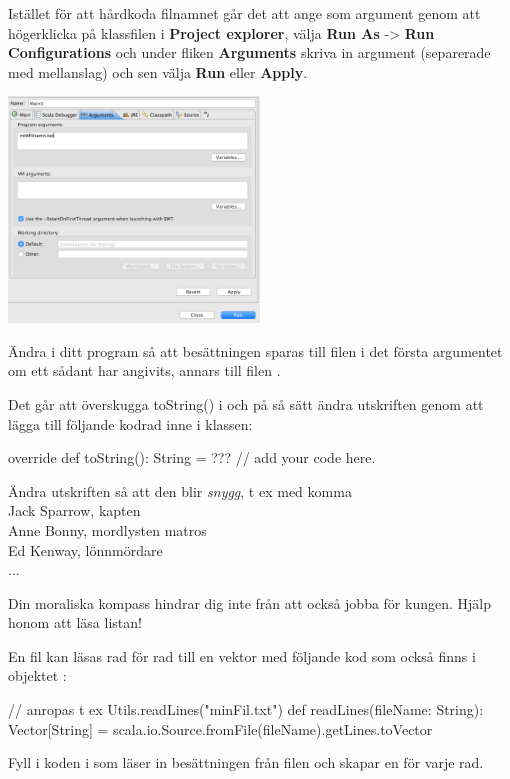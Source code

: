 Istället för att hårdkoda filnamnet går det att ange som argument genom att högerklicka på klassfilen i {\bf Project explorer}, välja {\bf Run As} -> {\bf Run Configurations} och under fliken {\bf Arguments} skriva in argument (separerade med mellanslag) och sen välja {\bf Run} eller {\bf Apply}. 
\begin{center}
\includegraphics[width=0.5\textwidth]{../img/pirates/args.png} \\
\end{center}

Ändra i ditt program så att besättningen sparas till filen i det första argumentet om ett sådant har angivits, annars till filen .

\Subtask Det går att överskugga toString() i  och på så sätt ändra utskriften genom att lägga till följande kodrad inne i klassen: 
\begin{Code}
override def toString(): String = ??? // add your code here. 
\end{Code}

\noindent Ändra utskriften så att den blir {\em snygg}, t ex med komma\\ 

\noindent Jack Sparrow, kapten \\
Anne Bonny, mordlysten matros \\
Ed Kenway, lönnmördare \\
... 
\newpage
{}

\Subtask Din moraliska kompass hindrar dig inte från att också jobba för kungen. Hjälp honom att läsa listan!

En fil  kan läsas rad för rad till en vektor med följande kod som också finns i objektet : 

\begin{Code}
// anropas t ex Utils.readLines("minFil.txt")
def readLines(fileName: String): Vector[String] = {
	   scala.io.Source.fromFile(fileName).getLines.toVector
	}
\end{Code}
Fyll i koden i  som läser in besättningen från filen och skapar en  för varje rad. 

